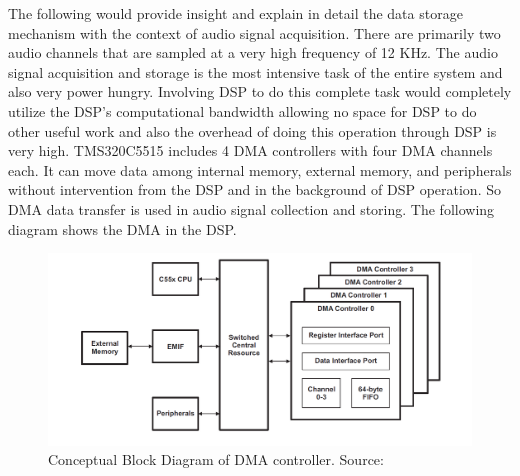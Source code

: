  The following would provide insight and explain in detail the data storage mechanism with the context of audio signal acquisition. There are primarily two audio channels that are sampled at a very high frequency of 12 KHz. The audio signal acquisition and storage is the most intensive task of the entire system and also very power hungry. Involving DSP to do this complete task would completely utilize the DSP's computational bandwidth allowing no space for DSP to do other useful work and also the overhead of doing this operation through DSP is very high.  TMS320C5515 includes 4 DMA controllers with four DMA channels each. It can move data among internal memory, external memory, and peripherals without intervention from the DSP and in the background of DSP operation. So DMA data transfer is used in audio signal collection and storing.  The following diagram shows the DMA in the DSP. 
 \begin{figure}[h]
 	\centering
 	\includegraphics[scale = 0.5 ]{DMA_overview.JPG}
 	\caption{Conceptual Block Diagram of DMA controller. Source:\cite{dma}\label{DMA_Architecture}}
 \end{figure} 


